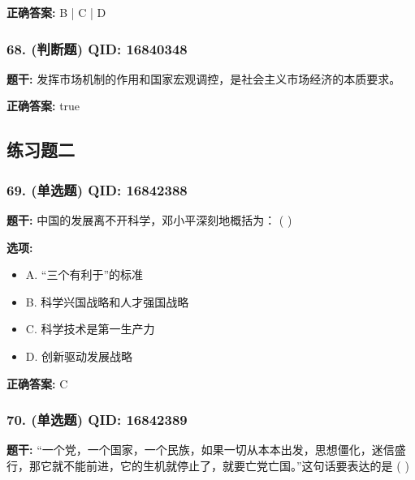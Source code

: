 \documentclass[12pt,UTF8]{ctexart}
\begin{document}
\textbf{正确答案:}
B | C | D

\vspace{0.3em}\hrulefill\vspace{0.7em}

\subsubsection*{68. (判断题) \small QID: 16840348}

\textbf{题干:}
发挥市场机制的作用和国家宏观调控，是社会主义市场经济的本质要求。

\textbf{正确答案:}
true

\vspace{0.3em}\hrulefill\vspace{0.7em}

\subsection*{练习题二}

\subsubsection*{69. (单选题) \small QID: 16842388}

\textbf{题干:}
中国的发展离不开科学，邓小平深刻地概括为： ( )

\textbf{选项:}
\begin{itemize}[leftmargin=*]

  \item A. “三个有利于”的标准

  \item B. 科学兴国战略和人才强国战略

  \item C. 科学技术是第一生产力

  \item D. 创新驱动发展战略

\end{itemize}

\textbf{正确答案:}
C

\vspace{0.3em}\hrulefill\vspace{0.7em}

\subsubsection*{70. (单选题) \small QID: 16842389}

\textbf{题干:}
“一个党，一个国家，一个民族，如果一切从本本出发，思想僵化，迷信盛行，那它就不能前进，它的生机就停止了，就要亡党亡国。”这句话要表达的是 ( )
\end{document}
